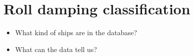 \section{Roll damping classification}
\label{se:rollDampingClassification}
\begin{itemize}
  \item What kind of ships are in the database?
  \item What can the data tell us?
\end{itemize}
